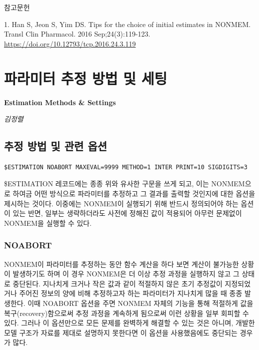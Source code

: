 \documentclass[
  10pt,
]{krantz}
\begin{document}
참고문헌

1. Han S, Jeon S, Yim DS. Tips for the choice of initial estimates in
NONMEM. Transl Clin Pharmacol. 2016 Sep;24(3):119-123.
\url{https://doi.org/10.12793/tcp.2016.24.3.119}

\hypertarget{uxd30cuxb77cuxbbf8uxd130-uxcd94uxc815-uxbc29uxbc95-uxbc0f-uxc138uxd305}{%
\chapter{파라미터 추정 방법 및 세팅}\label{uxd30cuxb77cuxbbf8uxd130-uxcd94uxc815-uxbc29uxbc95-uxbc0f-uxc138uxd305}}

\textbf{Estimation Methods \& Settings}

\emph{김정렬}

\hypertarget{uxcd94uxc815-uxbc29uxbc95-uxbc0f-uxad00uxb828-uxc635uxc158}{%
\section{추정 방법 및 관련 옵션}\label{uxcd94uxc815-uxbc29uxbc95-uxbc0f-uxad00uxb828-uxc635uxc158}}

\begin{verbatim}
$ESTIMATION NOABORT MAXEVAL=9999 METHOD=1 INTER PRINT=10 SIGDIGITS=3
\end{verbatim}

\$ESTIMATION 레코드에는 종종 위와 유사한 구문을 쓰게 되고, 이는 NONMEM으로 하여금 어떤 방식으로 파라미터를
추정하고 그 결과를 출력할 것인지에 대한 옵션을 제시하는 것이다. 이중에는 NONMEM이 실행되기 위해 반드시
정의되어야 하는 옵션이 있는 반면, 일부는 생략하더라도 사전에 정해진 값이 적용되어 아무런 문제없이 NONMEM을
실행할 수 있다.

\hypertarget{noabort}{%
\subsection{NOABORT}\label{noabort}}

NONMEM이 파라미터를 추정하는 동안 함수 계산을 하다 보면 계산이 불가능한 상황이 발생하기도 하며 이 경우 NONMEM은 더
이상 추정 과정을 실행하지 않고 그 상태로 중단된다. 지나치게 크거나 작은 값과 같이 적절하지 않은 초기 추정값이 지정되었거나
주어진 정보의 양에 비해 추정하고자 하는 파라미터가 지나치게 많을 때 종종 발생한다. 이때 NOABORT 옵션을 주면 NONMEM
자체의 기능을 통해 적절하게 값을 복구(recovery)함으로써 추정 과정을 계속하게 됨으로써 이런 상황을 일부 회피할 수 있다.
그러나 이 옵션만으로 모든 문제를 완벽하게 해결할 수 있는 것은 아니며, 개발한 모델 구조가 자료를 제대로 설명하지 못한다면 이
옵션을 사용했음에도 중단되는 경우가 많다.
\end{document}
